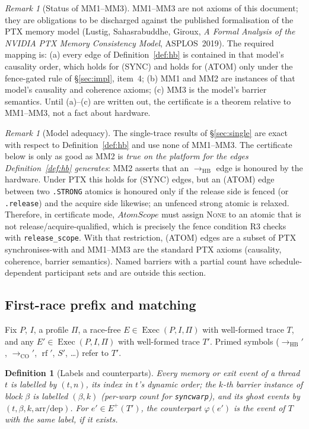 \documentclass[11pt]{article}
\newtheorem{definition}[theorem]{Definition}
\theoremstyle{remark}
\newtheorem{remark}[theorem]{Remark}
\DeclareMathOperator{\Exec}{Exec}
\DeclareMathOperator{\rf}{rf}
\newcommand{\HB}{\to_{\mathrm{HB}}}
\newcommand{\CO}{\to_{\mathrm{CO}}}
\newcommand{\Eplus}{E^{+}}
\begin{document}
\begin{remark}[Status of MM1--MM3]
MM1--MM3 are not axioms of this document; they are obligations to be discharged
against the published formalisation of the PTX memory model (Lustig,
Sahasrabuddhe, Giroux, \emph{A Formal Analysis of the NVIDIA PTX Memory
Consistency Model}, ASPLOS~2019). The required mapping is: (a) every edge of
Definition~\ref{def:hb} is contained in that model's causality order, which
holds for (SYNC) and holds for (ATOM) only under the fence-gated rule of
\S\ref{sec:impl}, item~4; (b) MM1 and MM2 are instances of that model's
causality and coherence axioms; (c) MM3 is the model's barrier semantics.
Until (a)--(c) are written out, the certificate is a theorem relative to
MM1--MM3, not a fact about hardware.
\end{remark}

\begin{remark}[Model adequacy]\label{rem:adequacy}
The single-trace results of \S\ref{sec:single} are exact with respect to
Definition~\ref{def:hb} and use none of MM1--MM3. The certificate below is only
as good as MM2 is \emph{true on the platform for the edges Definition~\ref{def:hb}
generates}: MM2 asserts that an $\HB$ edge is honoured by the hardware. Under
PTX this holds for (SYNC) edges, but an (ATOM) edge between two
\texttt{.STRONG} atomics is honoured only if the release side is fenced (or
\texttt{.release}) and the acquire side likewise; an unfenced strong atomic is
relaxed. Therefore, in certificate mode, $\mathit{AtomScope}$ must assign
\textsc{None} to an atomic that is not release/acquire-qualified, which is
precisely the fence condition R3 checks with \texttt{release\_scope}. With that
restriction, (ATOM) edges are a subset of PTX synchronises-with and MM1--MM3
are the standard PTX axioms (causality, coherence, barrier semantics). Named
barriers with a partial count have schedule-dependent participant sets and are
outside this section.
\end{remark}

\subsection{First-race prefix and matching}

Fix $P$, $I$, a profile $\Pi$, a race-free $E\in\Exec(P,I,\Pi)$ with well-formed
trace $T$, and any $E'\in\Exec(P,I,\Pi)$ with well-formed trace $T'$. Primed
symbols ($\HB'$, $\CO'$, $\rf'$, $S'$, \dots) refer to $T'$.

\begin{definition}[Labels and counterparts]
Every memory or exit event of a thread $t$ is labelled by $(t,n)$, its index in
$t$'s dynamic order; the $k$-th barrier instance of block $\beta$ is labelled
$(\beta,k)$ (per-warp count for \texttt{syncwarp}), and its ghost events by
$(t,\beta,k,\mathrm{arr}/\mathrm{dep})$. For $e'\in\Eplus(T')$, the
\emph{counterpart} $\varphi(e')$ is the event of $T$ with the same label, if it
exists.
\end{definition}
\end{document}
